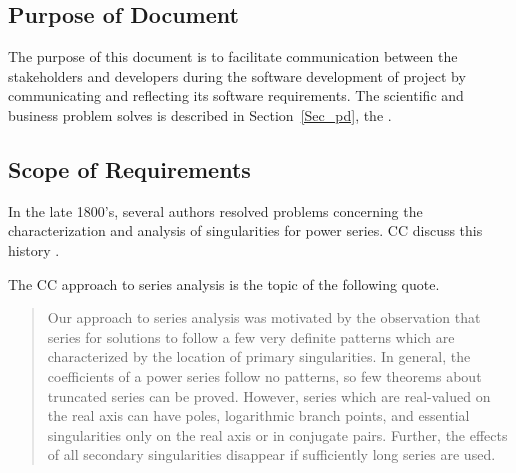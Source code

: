 \documentclass[12pt]{article}
\begin{document}
\subsection{Purpose of Document}

The purpose of this document is to facilitate communication between the stakeholders and developers
 during the software development of project 
 by communicating and reflecting its software requirements.
The scientific and business problem  solves is described in
Section~\ref{Sec_pd}, the . 


\subsection{Scope of Requirements}

In the late 1800's, several authors resolved problems
concerning the characterization and analysis of singularities for power series. CC discuss
this history \cite{chang1982}.

The CC approach to series analysis is the topic of the following quote.

\begin{quote}
Our approach to series analysis was motivated by the observation that series
for solutions to  follow a few very definite patterns which are characterized
by the location of primary singularities. In general, the coefficients of a power
series follow no patterns, so few theorems about truncated series can be proved.
However, series which are real-valued on the real axis can have poles, logarithmic
branch points, and essential singularities only on the real axis or in conjugate pairs.
Further, the effects of all secondary singularities disappear if sufficiently
  long series are used.  \citep[p.~122]{chang1982}
\end{quote}
\end{document}
